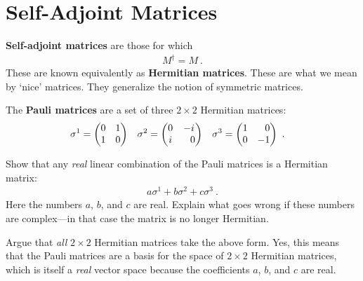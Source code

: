 \documentclass[12pt, oneside]{report}    %
\let\oldsection\section
\def\section{%
  \setcounter{sidenote}{1}%
  \oldsection
}
\begin{document}
\section{Self-Adjoint Matrices}

\textbf{Self-adjoint matrices} are those for which
\begin{align}
M^\dag = M \ .     
\end{align}
These are known equivalently as \textbf{Hermitian matrices}.
These are what we mean by `nice' matrices. They generalize the notion of symmetric matrices. 
\begin{example}
The \textbf{Pauli matrices} are a set of three $2\times 2$ Hermitian matrices:
\begin{align}
    \sigma^1
    &=
    \begin{pmatrix}
        0 & 1 \\
        1 & 0
    \end{pmatrix}
    &
    \sigma^2
    &=
    \begin{pmatrix}
        0 & -i \\
        i & \pp 0
    \end{pmatrix}
    &
    \sigma^3
    &=
    \begin{pmatrix}
        1 & \pp 0 \\
        0 & -1
    \end{pmatrix} \ .
\end{align}
\end{example}
\begin{exercise}
Show that any \emph{real} linear combination of the Pauli matrices is a Hermitian matrix:
\begin{align}
    a \sigma^1 + b \sigma^2 + c\sigma^3 \ .
\end{align}
Here the numbers $a$, $b$, and $c$ are real. Explain what goes wrong if these numbers are complex---in that case the matrix is no longer Hermitian.

Argue that \emph{all} $2\times 2$ Hermitian matrices take the above form. Yes, this means that the Pauli matrices are a basis for the space of $2\times 2$ Hermitian matrices, which is itself a \emph{real} vector space because the coefficients $a$, $b$, and $c$ are real.
\end{exercise}

\end{document}
